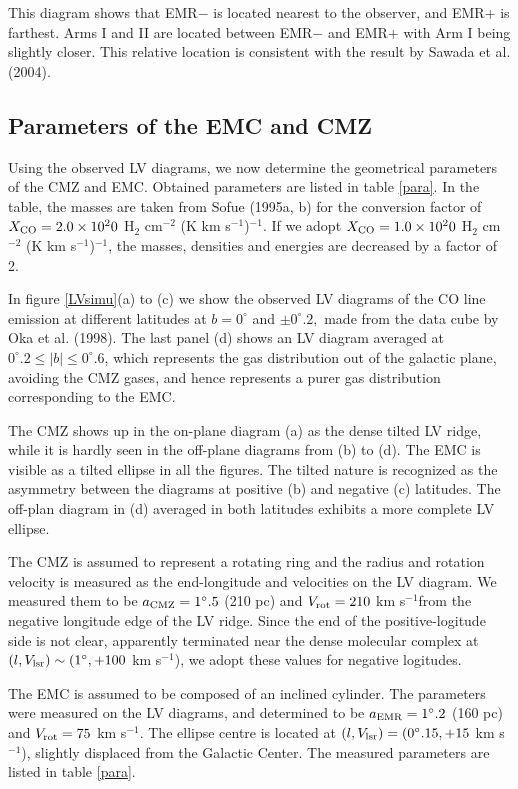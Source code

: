 \documentclass[useAMS,usenatbib]{mn2e}
\def\kms{km s$^{-1}$}
\def\vlsr{V_{\rm lsr}}
\def\vrot{V_{\rm rot}}
\def\vrot{V_{\rm rot}}
\def\deg{^\circ}\def\Deg{^\circ}
\def\acmz{a_{\rm CMZ}} \def\aemr{a_{\rm EMR}}
\begin{document}
This diagram shows that EMR$-$ is located nearest to the observer, and EMR+ is farthest. Arms I and II are located between EMR$-$ and EMR+ with Arm I being slightly closer. This relative location is consistent with the result by Sawada et al. (2004). 

 
\subsection{Parameters of the EMC and CMZ} 
 
Using the observed LV diagrams, we now determine the geometrical parameters of the CMZ and EMC. Obtained parameters are listed in table \ref{para}. In the table, the masses are taken from Sofue (1995a, b) for the conversion factor of $X_{\rm CO}=2.0 \times 10^20$ H$_2$ cm$^{-2}$  (K \kms)$^{-1}$. If we adopt $X_{\rm CO}=1.0 \times 10^20$ H$_2$ cm$^{-2}$  (K \kms)$^{-1}$, the masses, densities and energies are decreased by a factor of 2.

In figure \ref{LVsimu}(a) to (c) we show the observed LV diagrams of the CO line emission at different latitudes at $b=0\deg$ and $ \pm 0\deg.2,$ made from the data cube by Oka et al. (1998). The last panel (d) shows an LV diagram averaged at $0\deg.2\le |b|\le 0\deg.6$, which represents the gas distribution out of the galactic plane, avoiding the CMZ gases, and hence represents a purer gas distribution corresponding to the EMC.

The CMZ shows up in the on-plane diagram (a) as the dense tilted LV ridge, while it is hardly seen in the off-plane diagrams from (b) to (d). The EMC is visible as a tilted ellipse in all the figures. The tilted nature is recognized as the asymmetry between the diagrams at positive (b) and negative (c) latitudes. The off-plan diagram in (d) averaged in both latitudes exhibits a more complete LV ellipse.

The CMZ is assumed to represent a rotating ring and the radius and rotation velocity is measured as the end-longitude and velocities on the LV diagram. We measured them to be $\acmz=1\deg.5$ (210 pc) and $\vrot=210$ \kms from the negative longitude edge of the LV ridge. Since the end of the positive-logitude side is not clear, apparently terminated near the dense molecular complex at $(l,\vlsr)\sim (1\deg, +100$ \kms), we adopt these values for negative logitudes.

The EMC is assumed to be composed of an inclined cylinder. The parameters were measured on the LV diagrams, and determined to be $\aemr=1\deg.2$ (160 pc) and $\vrot=75$ \kms. The ellipse centre is located at $(l,\vlsr)=(0\deg.15, +15$ \kms), slightly displaced from the Galactic Center. The measured parameters are listed in table \ref{para}.
\end{document}
